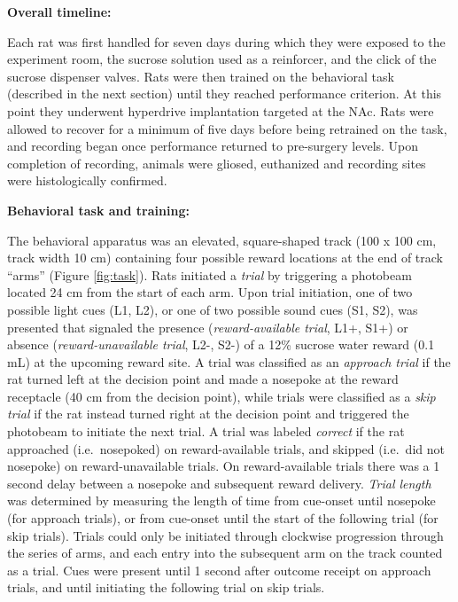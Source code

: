 \documentclass[11pt]{article}
\providecommand{\DIFadd}[1]{{\protect\color{red} \sf #1}} %
\providecommand{\DIFdel}[1]{} %
\providecommand{\DIFaddbegin}{} %
\providecommand{\DIFaddend}{} %
\providecommand{\DIFdelbegin}{} %
\providecommand{\DIFdelend}{} %
\newcommand{\DIFscaledelfig}{0.5}
\newlength{\DIFdelgraphicswidth} %
\newlength{\DIFdelgraphicsheight} %
\newcommand{\DIFaddincludegraphics}[2][]{{\color{red}\fbox{\DIFOincludegraphics[#1]{#2}}}} %
\newcommand{\DIFdelincludegraphics}[2][]{%
\sbox{\DIFdelgraphicsbox}{\DIFOincludegraphics[#1]{#2}}%
\settoboxwidth{\DIFdelgraphicswidth}{\DIFdelgraphicsbox} %
\settoboxtotalheight{\DIFdelgraphicsheight}{\DIFdelgraphicsbox} %
\scalebox{\DIFscaledelfig}{%
\parbox[b]{\DIFdelgraphicswidth}{\usebox{\DIFdelgraphicsbox}\\[-\baselineskip] \rule{\DIFdelgraphicswidth}{0em}}\llap{\resizebox{\DIFdelgraphicswidth}{\DIFdelgraphicsheight}{%
\setlength{\unitlength}{\DIFdelgraphicswidth}%
\begin{picture}(1,1)%
\thicklines\linethickness{2pt} %
{\color[rgb]{1,0,0}\put(0,0){\framebox(1,1){}}}%
{\color[rgb]{1,0,0}\put(0,0){\line( 1,1){1}}}%
{\color[rgb]{1,0,0}\put(0,1){\line(1,-1){1}}}%
\end{picture}%
}\hspace*{3pt}}} %
} %
\DeclareRobustCommand{\DIFaddbegin}{\DIFOaddbegin \let\includegraphics\DIFaddincludegraphics} %
\DeclareRobustCommand{\DIFaddend}{\DIFOaddend \let\includegraphics\DIFOincludegraphics} %
\DeclareRobustCommand{\DIFdelbegin}{\DIFOdelbegin \let\includegraphics\DIFdelincludegraphics} %
\DeclareRobustCommand{\DIFdelend}{\DIFOaddend \let\includegraphics\DIFOincludegraphics} %
\begin{document}
{\bf Overall timeline:}

Each rat was first handled for seven days during which they were
exposed to the experiment room, the sucrose solution used as a
reinforcer, and the click of the sucrose dispenser valves. Rats were
then trained on the behavioral task (described in the next section)
until they reached performance criterion. At this point they
underwent hyperdrive implantation targeted at the NAc. Rats were
allowed to recover for a minimum of five days before being retrained
on the task, and recording began once performance returned to
pre-surgery levels. Upon completion of recording, animals were gliosed,
euthanized and recording sites were histologically confirmed.

{\bf Behavioral task and training:}

The behavioral apparatus was an elevated, square-shaped track (100 x
100 cm, track width 10 cm) containing four possible reward locations
at the end of track ``arms'' (Figure \ref{fig:task}). Rats initiated a
{\it trial} by triggering a photobeam located 24 cm from the start of
each arm. Upon trial initiation, one of two possible light cues (L1,
L2), or one of two possible sound cues (S1, S2), was presented that
signaled the presence ({\it reward-available trial}, L1+, S1+) or
absence ({\it reward-unavailable trial}, L2-, S2-) of a 12\% sucrose
water reward (0.1 mL) at the upcoming reward site. A trial was
classified as an {\it approach trial} if the rat turned left at the
decision point and made a nosepoke at the reward receptacle (40 cm
from the decision point), while trials were classified as a {\it skip
trial} if the rat instead turned right at the decision point and
triggered the photobeam to initiate the next trial. A trial \DIFdelbegin \DIFdel{is }\DIFdelend \DIFaddbegin \DIFadd{was }\DIFaddend labeled
{\it correct} if the rat approached (i.e.\ nosepoked) on
reward-available trials, and skipped (i.e.\ did not nosepoke) on
reward-unavailable trials. On reward-available trials there was a 1
second delay between a nosepoke and subsequent reward delivery. {\it
Trial length} was determined by measuring the length of time from
\DIFdelbegin \DIFdel{cue onset }\DIFdelend \DIFaddbegin \DIFadd{cue-onset }\DIFaddend until nosepoke (for approach trials), or from \DIFdelbegin \DIFdel{cue onset
}\DIFdelend \DIFaddbegin \DIFadd{cue-onset
}\DIFaddend until the start of the following trial (for skip trials). Trials could
only be initiated through clockwise progression through the series of
arms, and each entry into the subsequent arm on the track counted as a
trial. \DIFaddbegin \DIFadd{Cues were present until 1  second after outcome receipt on approach trials, and until initiating the following trial on skip trials.
}\DIFaddend 
\end{document}
